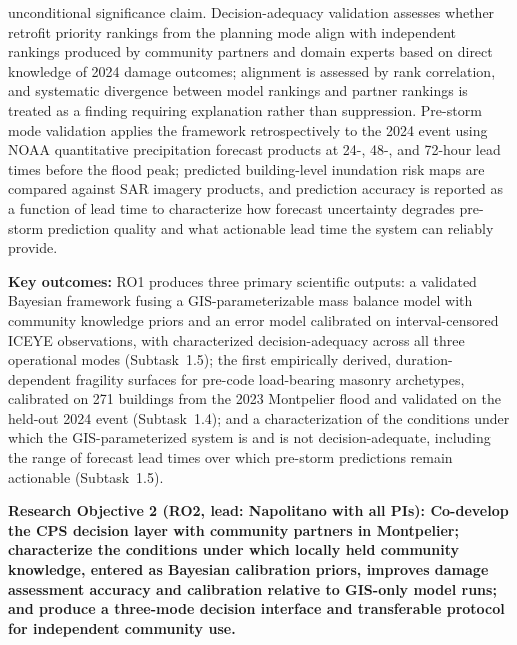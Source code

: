 \documentclass[11pt]{article}
\begin{document}
unconditional significance claim.
Decision-adequacy validation assesses whether retrofit priority rankings from the
planning mode align with independent rankings produced by community partners and
domain experts based on direct knowledge of 2024 damage outcomes; alignment is
assessed by rank correlation, and systematic divergence between model rankings and
partner rankings is treated as a finding requiring explanation rather than
suppression.
Pre-storm mode validation applies the framework retrospectively to the 2024 event
using NOAA quantitative precipitation forecast products at 24-, 48-, and 72-hour
lead times before the flood peak; predicted building-level inundation risk maps are
compared against SAR imagery products, and prediction accuracy is reported as a function
of lead time to characterize how forecast uncertainty degrades pre-storm prediction
quality and what actionable lead time the system can reliably provide.

\textbf{Key outcomes:} RO1 produces three primary scientific outputs: a validated
Bayesian framework fusing a GIS-parameterizable mass balance model with community
knowledge priors and an error model calibrated on interval-censored ICEYE
observations, with characterized
decision-adequacy across all three operational modes (Subtask~1.5); the first
empirically derived, duration-dependent fragility surfaces for pre-code
load-bearing masonry archetypes, calibrated on 271 buildings from the 2023
Montpelier flood and validated on the held-out 2024 event (Subtask~1.4); and
a characterization of the conditions under which the GIS-parameterized system
is and is not decision-adequate, including the range of forecast lead times over
which pre-storm predictions remain actionable (Subtask~1.5).

\vspace{5pt}
\begin{tcolorbox}[colback=mycmykcolor,colframe=black,boxrule=1pt,coltext=black,
  left=1mm,right=1mm,top=1mm,bottom=1mm]
\textbf{Research Objective 2 (RO2, lead: Napolitano with all PIs): Co-develop
the CPS decision layer with community partners in Montpelier; characterize the
conditions under which locally held community knowledge, entered as Bayesian
calibration priors, improves damage assessment accuracy and calibration relative
to GIS-only model runs; and produce a three-mode decision interface and
transferable protocol for independent community use.}
\end{tcolorbox}
\end{document}
